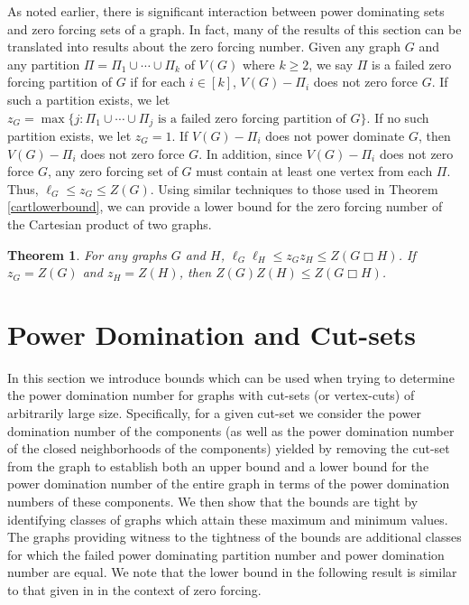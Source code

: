 \documentclass[11pt]{article}
\newtheorem{theorem}{Theorem}
\begin{document}
As noted earlier, there is significant interaction between power dominating sets and zero forcing sets of a graph. In fact, many of the results of this  section can be translated into results about the zero forcing number. Given any graph $G$ and any partition $\Pi = \Pi_1 \cup \cdots \cup \Pi_k$ of $V(G)$ where $k\ge2$, we say $\Pi$ is a failed zero forcing partition of $G$ if for each $i\in [k]$, $V(G) - \Pi_i$ does not zero force $G$. If such a partition exists, we let $z_G= \max\{j: \Pi_1 \cup \cdots \cup \Pi_j \text{ is a failed zero forcing partition of $G$}\}$. If no such partition exists, we let $z_G = 1$. If $V(G) - \Pi_i$ does not power dominate $G$, then $V(G) - \Pi_i$ does not zero force $G$. In addition, since $V(G) - \Pi_i$ does not zero force $G$, any zero forcing set of $G$ must contain at least one vertex from each $\Pi$. Thus, $\ell_G \leq z_G \leq Z(G)$. Using similar techniques to those used in Theorem \ref{cartlowerbound}, we can provide a lower bound for the zero forcing number of the Cartesian product of two graphs.

\begin{theorem} For any graphs $G$ and $H$, $\ell_G \ell_H \leq z_Gz_H \leq Z(G \Box H)$. If $z_G = Z(G)$ and $z_H = Z(H)$, then $Z(G)Z(H) \leq Z(G \Box H)$.
\end{theorem}

\section{Power Domination and Cut-sets}
In this section we introduce bounds which can be used when trying to determine the power domination number for graphs with cut-sets (or vertex-cuts) of arbitrarily large size.  Specifically, for a given cut-set we consider the power domination number of the components (as well as the power domination number of the closed neighborhoods of the components) yielded by removing the cut-set from the graph to establish both an upper bound and a lower bound for the power domination number of the entire graph in terms of the power domination numbers of these components.  We then show that the bounds are tight by identifying classes of graphs which attain these maximum and minimum values.  The graphs providing witness to the tightness of the bounds are additional classes for which the failed power dominating partition number and power domination number are equal. We note that the lower bound in the following result is similar to that given in \cite{HS-thesis} in the context of zero forcing. 
\end{document}

